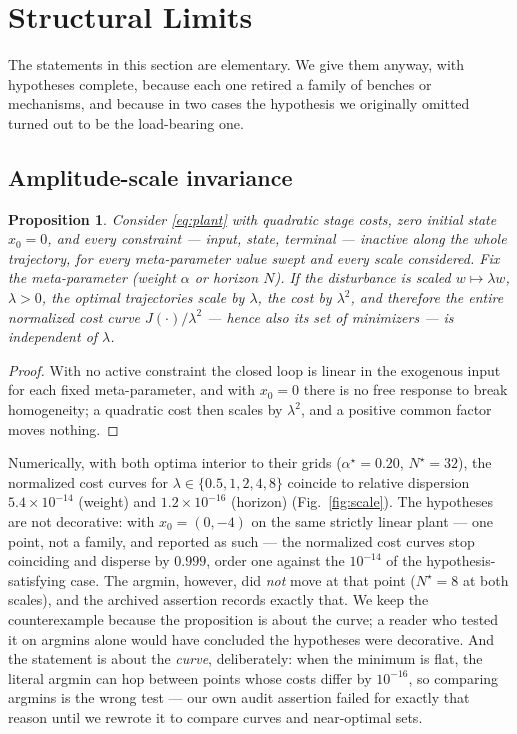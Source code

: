 \documentclass[journal]{IEEEtran}
\newtheorem{proposition}{Proposition}
\theoremstyle{definition}
\begin{document}
\section{Structural Limits}\label{sec:limits}
The statements in this section are elementary. We give them anyway, with
hypotheses complete, because each one retired a family of benches or
mechanisms, and because in two cases the hypothesis we originally omitted
turned out to be the load-bearing one.

\subsection{Amplitude-scale invariance}
\begin{proposition}\label{prop:scale}
Consider \eqref{eq:plant} with quadratic stage costs, zero initial state
$x_0=0$, and every constraint --- input, state, terminal --- inactive along the
whole trajectory, for every meta-parameter value swept and every scale
considered. Fix the meta-parameter (weight $\alpha$ or horizon $N$). If the
disturbance is scaled $w\mapsto\lambda w$, $\lambda>0$, the optimal
trajectories scale by $\lambda$, the cost by $\lambda^2$, and therefore the
entire normalized cost curve $J(\cdot)/\lambda^2$ --- hence also its set of
minimizers --- is independent of $\lambda$.
\end{proposition}
\begin{proof}
With no active constraint the closed loop is linear in the exogenous input for
each fixed meta-parameter, and with $x_0=0$ there is no free response to break
homogeneity; a quadratic cost then scales by $\lambda^2$, and a positive common
factor moves nothing.
\end{proof}

Numerically, with both optima interior to their grids
($\alpha^\star=0.20$, $N^\star=32$), the normalized cost curves for
$\lambda\in\{0.5,1,2,4,8\}$ coincide to relative dispersion
$5.4\times10^{-14}$ (weight) and $1.2\times10^{-16}$ (horizon)
(Fig.~\ref{fig:scale}). The hypotheses are not decorative: with
$x_0=(0,-4)$ on the same strictly linear plant --- one point, not a
family, and reported as such --- the normalized cost curves stop
coinciding and disperse by $0.999$, order one against the $10^{-14}$ of
the hypothesis-satisfying case. The argmin, however, did \emph{not}
move at that point ($N^\star=8$ at both scales), and the archived
assertion records exactly that. We keep the counterexample because the
proposition is about the curve; a reader who tested it on argmins alone
would have concluded the hypotheses were decorative. And the statement is
about the \emph{curve}, deliberately: when the minimum is flat, the literal
argmin can hop between points whose costs differ by $10^{-16}$, so comparing
argmins is the wrong test --- our own audit assertion failed for exactly that
reason until we rewrote it to compare curves and near-optimal sets.
\end{document}
